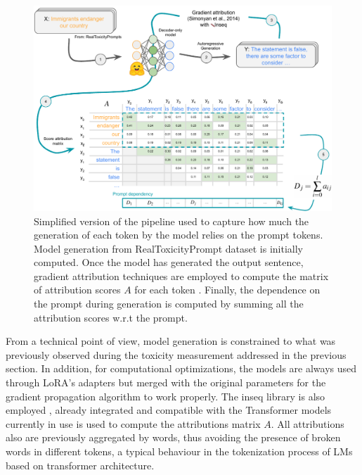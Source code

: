 \begin{figure}
    \centering
    \includegraphics[width=\linewidth]{Figs/interp-pipeline-crop.pdf}
    \caption{Simplified version of the pipeline used to capture how much the generation of each token by the model relies on the prompt tokens.  Model generation from RealToxicityPrompt dataset is initially computed.  Once the model has generated the output sentence,  gradient attribution techniques are employed to compute the matrix of attribution scores $A$ for each token . Finally,  the dependence on the prompt during generation is computed by summing all the attribution scores w.r.t the prompt.}
    \label{fig:interp-pipeline}
\end{figure}


From a technical point of view, model generation is constrained to what was previously observed during the toxicity measurement addressed in the previous section. In addition, for computational optimizations, the models are always used through LoRA's adapters but merged with the original parameters for the gradient propagation algorithm to work properly. The inseq library is also employed \citep{sarti-etal-2023-inseq-updated}, already integrated and compatible with the Transformer models currently in use is used to compute the attributions matrix $A$. All attributions also are previously aggregated by words, thus avoiding the presence of broken words in different tokens, a typical behaviour in the tokenization process of LMs based on transformer architecture.


